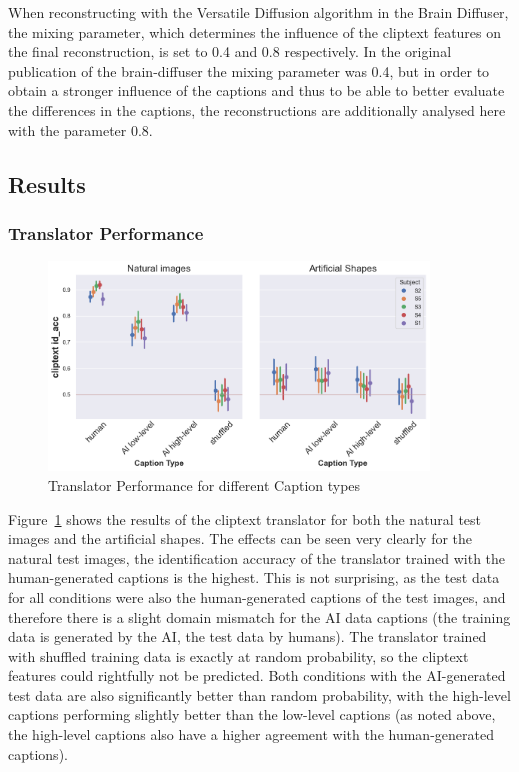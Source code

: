 When reconstructing with the Versatile Diffusion algorithm in the Brain Diffuser, the mixing parameter, which determines the influence of the cliptext features on the final reconstruction, is set to 0.4 and 0.8 respectively. In the original publication of the brain-diffuser\cite{ozcelikNaturalSceneReconstruction2023} the mixing parameter was 0.4, but in order to obtain a stronger influence of the captions and thus to be able to better evaluate the differences in the captions, the reconstructions are additionally analysed here with the parameter 0.8.


\subsection{Results}

\subsubsection{Translator Performance}

\begin{figure}[ht]
    \centering
    \includegraphics[width=0.9\textwidth]{plots/aicap_translator.png}
    \caption{Translator Performance for different Caption types}\label{fig:aicap_translator}
\end{figure}

Figure~\ref{fig:aicap_translator} shows the results of the cliptext translator for both the natural test images and the artificial shapes. The effects can be seen very clearly for the natural test images, the identification accuracy of the translator trained with the human-generated captions is the highest. This is not surprising, as the test data for all conditions were also the human-generated captions of the test images, and therefore there is a slight domain mismatch for the AI data captions (the training data is generated by the AI, the test data by humans). The translator trained with shuffled training data is exactly at random probability, so the cliptext features could rightfully not be predicted. Both conditions with the AI-generated test data are also significantly better than random probability, with the high-level captions performing slightly better than the low-level captions (as noted above, the high-level captions also have a higher agreement with the human-generated captions). 


